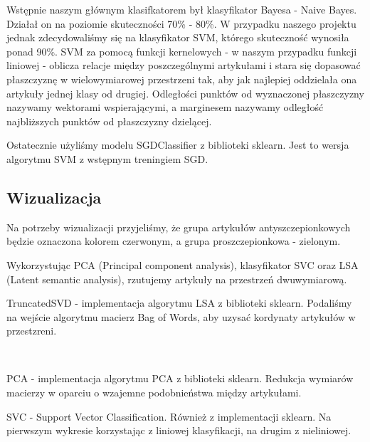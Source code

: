 \documentclass[11pt]{article}
\begin{document}
Wstępnie naszym głównym klasifkatorem był klasyfikator Bayesa - Naive Bayes.
Działał on na poziomie skuteczności 70\% - 80\%. W przypadku naszego projektu
jednak zdecydowaliśmy się na klasyfikator SVM, którego skuteczność wynosiła 
ponad 90\%. SVM za pomocą funkcji kernelowych - w naszym przypadku funkcji liniowej
- oblicza relacje między poszczególnymi artykułami i stara 
się dopasować płaszczyznę w wielowymiarowej przestrzeni tak, aby jak najlepiej 
oddzielała ona artykuły jednej klasy od drugiej. Odległości punktów od wyznaczonej 
płaszczyzny nazywamy wektorami wspierającymi, a marginesem nazywamy odległość 
najbliższych punktów od płaszczyzny dzielącej.

Ostatecznie użyliśmy modelu SGDClassifier z biblioteki sklearn.
Jest to wersja algorytmu SVM z wstępnym treningiem SGD.

\subsection*{Wizualizacja}

Na potrzeby wizualizacji przyjeliśmy, że grupa artykułów antyszczepionkowych 
będzie oznaczona kolorem czerwonym, a grupa proszczepionkowa - zielonym.

Wykorzystując PCA (Principal component analysis), klasyfikator SVC oraz 
LSA (Latent semantic analysis), rzutujemy artykuły na przestrzeń dwuwymiarową.

TruncatedSVD - implementacja algorytmu LSA z biblioteki sklearn.
Podaliśmy na wejście algorytmu macierz Bag of Words, aby uzysać kordynaty artykułów w przestzreni.

    \begin{center}
    \end{center}
    { \hspace*{\fill} \\}

PCA - implementacja algorytmu PCA z biblioteki sklearn. Redukcja wymiarów macierzy w oparciu o
wzajemne podobnieństwa między artykułami.

SVC - Support Vector Classification. Również z implementacji sklearn. Na pierwszym wykresie
korzystając z liniowej klasyfikacji, na drugim z nieliniowej.
    
    \begin{center}
    \end{center}
    { \hspace*{\fill} \\}
    
\end{document}
